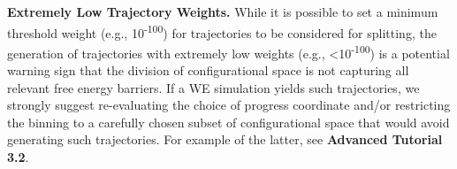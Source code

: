 \textbf{Extremely Low Trajectory Weights.} While it is possible to set a minimum threshold weight (e.g., 10\textsuperscript{-100}) for trajectories to be considered for splitting, the generation of trajectories with extremely low weights (e.g., <10\textsuperscript{-100}) is a potential warning sign that the division of configurational space is not capturing all relevant free energy barriers. 
If a WE simulation yields such trajectories, we strongly suggest re-evaluating the choice of progress coordinate and/or restricting the binning to a carefully chosen subset of configurational space that would avoid generating such trajectories.
For example of the latter, see \textbf{Advanced Tutorial 3.2}.